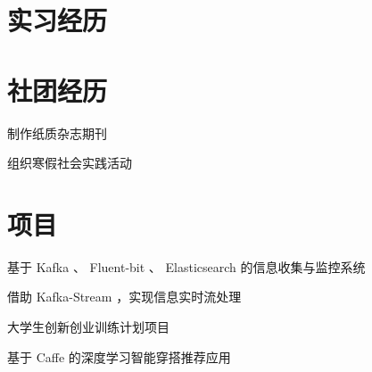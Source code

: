 \documentclass[]{deedy-resume-openfont}
\begin{document}
\begin{minipage}[t]{0.73\textwidth} 


\section{实习经历}
\sectionsep


\sectionsep

\section{社团经历}
\sectionsep

\begin{tightemize}
    \item
    \item 制作纸质杂志期刊
\end{tightemize}

\sectionsep

\begin{tightemize}
    \item 组织寒假社会实践活动
\end{tightemize}

\sectionsep


\section{项目}
\sectionsep

\begin{tightemize}
    \item 基于 Kafka 、 Fluent-bit 、 Elasticsearch 的信息收集与监控系统
    \item 借助 Kafka-Stream ，实现信息实时流处理
\end{tightemize}
\sectionsep

\begin{tightemize}
    \item 大学生创新创业训练计划项目
    \item 基于 Caffe 的深度学习智能穿搭推荐应用
\end{tightemize}


\end{minipage}
\end{document}
